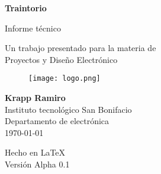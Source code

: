 \documentclass[../informe_krapp.tex]{subfiles}
\begin{document}
\begin{titlepage}
	\begin{center}
		\vspace{1cm}

		{\Huge
			\textbf{Traintorio}}

		\vspace{0.3cm}
		{\LARGE
			Informe técnico}

		\vspace{0.5cm}
		{\Large
			Un trabajo presentado para la materia de \\
			Proyectos y Diseño Electrónico}

		\vspace{2cm}

		\begin{figure}[H]
			\centering
			\texttt{[image: logo.png]}
		\end{figure}

		\vfill

		{\Large
			\textbf{Krapp Ramiro} \\
			\vspace{0.5cm}
			Instituto tecnológico San Bonifacio\\
			Departamento de electrónica\\
			\today
		}

		\vspace{0.5cm}
		{\large Hecho en {\LaTeX}\\
			Versión Alpha 0.1}

	\end{center}
\end{titlepage}
\end{document}

